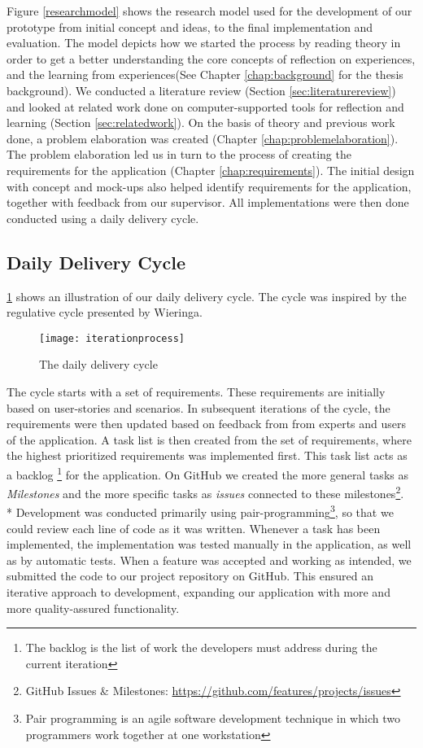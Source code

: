 Figure \ref{researchmodel} shows the research model used for the development of our prototype from initial concept and ideas, to the final implementation and evaluation. The model depicts how we started the process by reading theory in order to get a better understanding the core concepts of reflection on experiences, and the learning from experiences(See Chapter \ref{chap:background} for the thesis background). We conducted a literature review (Section \ref{sec:literaturereview}) and looked at related work done on computer-supported tools for reflection and learning (Section \ref{sec:relatedwork}). On the basis of theory and previous work done, a problem elaboration was created (Chapter \ref{chap:problemelaboration}). The problem elaboration led us in turn to the process of creating the requirements for the application (Chapter \ref{chap:requirements}). The initial design with concept and mock-ups also helped identify requirements for the application, together with feedback from our supervisor. All implementations were then done conducted using a daily delivery cycle.
\clearpage

\subsection{Daily Delivery Cycle}
\label{sec:dailydeliverycycle}

 \ref{iterationprocess} shows an illustration of our daily delivery cycle. The cycle was inspired by the regulative cycle presented by Wieringa\citep{wieringa}. 
\begin{figure}[!htpb]
\centering
	\texttt{[image: iterationprocess]}
\caption{The daily delivery cycle}
\label{iterationprocess}
\end{figure}

The cycle starts with a set of requirements. These requirements are initially based on user-stories and scenarios. In subsequent iterations of the cycle, the requirements were then updated based on feedback from from experts and users of the application. A task list is then created from the set of requirements, where the highest prioritized requirements was implemented first. This task list acts as a backlog 
\footnote{The backlog is the list of work the developers must address during the current iteration} for the application. On GitHub we created the more general tasks as \emph{Milestones} and the more specific tasks as \emph{issues} connected to these milestones\footnote{GitHub Issues \& Milestones: \url{https://github.com/features/projects/issues}}.\\* Development was conducted primarily using pair-programming\footnote{Pair programming is an agile software development technique in which two programmers work together at one workstation}, so that we could review each line of code as it was written. Whenever a task has been implemented, the implementation was tested manually in the application, as well as by automatic tests. When a feature was accepted and working as intended, we submitted the code to our project repository on GitHub.
This ensured an iterative approach to development, expanding our application with more and more quality-assured functionality. 

